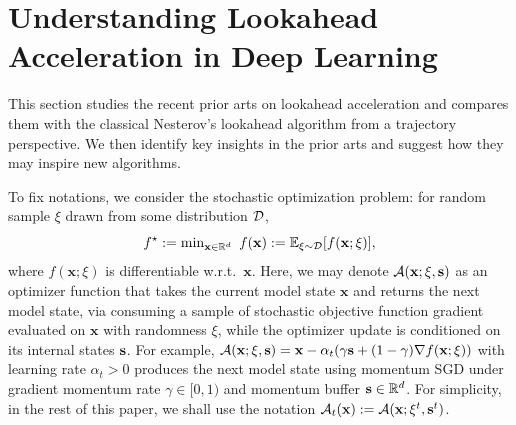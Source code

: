 \documentclass{article}
\theoremstyle{plain}
\theoremstyle{definition}
\theoremstyle{remark}
\def\bx{\mathbf{x}}
\begin{document}
\vspace{-0.5\baselineskip}
\section{Understanding Lookahead Acceleration in Deep Learning} \label{sec:understanding}
\vspace{-0.5\baselineskip}
This section studies the recent prior arts on lookahead acceleration and compares them with the classical Nesterov's lookahead algorithm from a trajectory perspective. 
We then identify key insights in the prior arts and suggest how they may inspire new algorithms. 

To fix notations, we consider the stochastic optimization problem: for random sample $\xi$ drawn from some distribution ${\cal D}$,
\begin{equation} \label{eq:opt}
    f^\star := \textstyle \min_{ \bx \in \mathbb{R}^d }~f( \bx ) := \mathbb{E}_{ \xi \sim {\cal D} } [ f( \bx; \xi ) ],
\end{equation}
where $f( \bx; \xi )$ is differentiable w.r.t.~$\bx$. Here, we may denote ${\cal A}(\bx; \xi, {\bf s})$ as an optimizer function that takes the current model state $\bx$ and returns the next model state, via consuming a sample of stochastic objective function gradient evaluated on $\bx$ with randomness $\xi$, while the optimizer update is conditioned on its internal states ${\bf s}$. For example, ${\cal A}(\bx; \xi, {\bf s}) = \bx - \alpha_t ( \gamma {\bf s} + (1-\gamma) \nabla f(\bx; \xi))$ with learning rate $\alpha_t > 0$ produces the next model state using momentum SGD under gradient momentum rate $\gamma \in [0, 1)$ and momentum buffer ${\bf s} \in \mathbb{R}^d$. For simplicity, in the rest of this paper, we shall use the notation ${\cal A}_t({\bf x}) := {\cal A}({\bf x}; \xi^t, {\bf s}^t)$.
\end{document}
